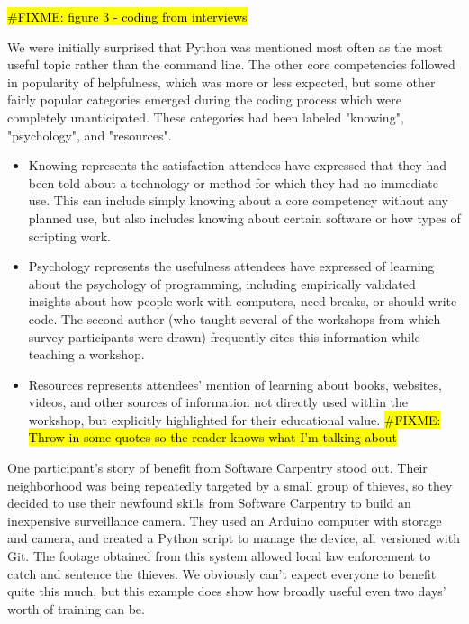 \documentclass[submission,copyright,creativecommons]{eptcs}
\newcommand{\fixme}[1]{\hl{\#FIXME: #1}}
\begin{document}
\fixme{figure 3 - coding from interviews}

We were initially surprised that Python was mentioned most often as the most useful topic rather than the command line.
The other core competencies followed in popularity of helpfulness,
which was more or less expected,
but some other fairly popular categories emerged during the coding process which were completely unanticipated.
These categories had been labeled "knowing", "psychology", and "resources".

\begin{itemize}
    \item
    Knowing represents the satisfaction attendees have expressed that they had been told about a technology or method
    for which they had no immediate use.
    This can include simply knowing about a core competency without any planned use,
    but also includes knowing about certain software or how types of scripting work.
    
    \item
    Psychology represents the usefulness attendees have expressed of learning about the psychology of programming,
    including empirically validated insights about how people work with computers,
    need breaks,
    or should write code.
    The second author (who taught several of the workshops from which survey participants were drawn)
    frequently cites this information while teaching a workshop.
    
    \item
    Resources represents attendees' mention of learning about books, websites, videos, and other sources of information
    not directly used within the workshop,
    but explicitly highlighted for their educational value.
    \fixme{Throw in some quotes so the reader knows what I'm talking about}
\end{itemize}

One participant's story of benefit from Software Carpentry stood out.
Their neighborhood was being repeatedly targeted by a small group of thieves,
so they decided to use their newfound skills from Software Carpentry to build an inexpensive surveillance camera.
They used an Arduino computer with storage and camera,
and created a Python script to manage the device,
all versioned with Git.
The footage obtained from this system allowed local law enforcement to catch and sentence the thieves.
We obviously can't expect everyone to benefit quite this much,
but this example does show how broadly useful even two days' worth of training can be.
\end{document}
